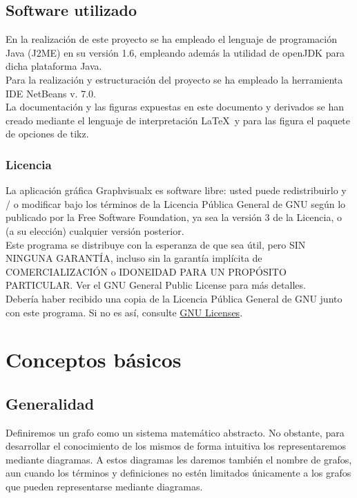 \documentclass[a4paper,12pt]{article}
\begin{document}
\subsection{Software utilizado}

En la realización de este proyecto se ha empleado el lenguaje de programación Java (J2ME) en su versión 1.6, empleando además la utilidad de openJDK para dicha plataforma Java.\\

Para la realización y estructuración del proyecto se ha empleado la herramienta IDE NetBeans v. 7.0.\\

La documentación y las figuras expuestas en este documento y derivados se han creado mediante el lenguaje de interpretación \LaTeX\ y para las figura el paquete de opciones de tikz.\\

\subsubsection{Licencia}

La aplicación gráfica Graphvisualx es software libre: usted puede redistribuirlo y / o modificar bajo los términos de la Licencia Pública General de GNU según lo publicado por la Free Software Foundation, ya sea la versión 3 de la Licencia, o (a su elección) cualquier versión posterior.\\

Este programa se distribuye con la esperanza de que sea útil, pero SIN NINGUNA GARANTÍA, incluso sin la garantía implícita de COMERCIALIZACIÓN o IDONEIDAD PARA UN PROPÓSITO PARTICULAR. Ver el GNU General Public License para más detalles.\\

Debería haber recibido una copia de la Licencia Pública General de GNU junto con este programa. Si no es así, consulte \href{http://www.gnu.org/licenses/}{GNU Licenses}.\\

\section{Conceptos básicos}

\subsection{Generalidad}

Definiremos un grafo como un sistema matemático abstracto. No obstante, para desarrollar el conocimiento de los mismos de forma intuitiva los representaremos mediante diagramas. A estos diagramas les daremos también el nombre de grafos, aun cuando los términos y definiciones no estén limitados únicamente a los grafos que pueden representarse mediante diagramas.
\end{document}
